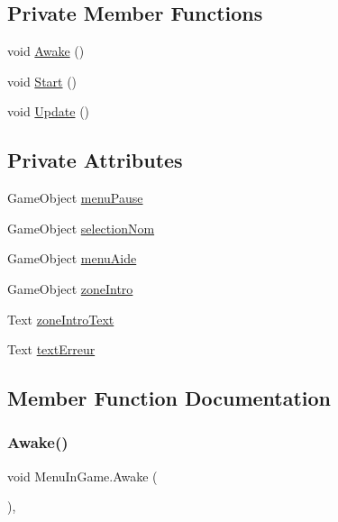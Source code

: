 \subsection*{Private Member Functions}
\begin{DoxyCompactItemize}
\item 
void \mbox{\hyperlink{class_menu_in_game_a999d7c65e06248c24bc4743b9f73a388}{Awake}} ()
\item 
void \mbox{\hyperlink{class_menu_in_game_a1dca3c194244a6dde3cbc99df42a819c}{Start}} ()
\item 
void \mbox{\hyperlink{class_menu_in_game_a47696469d25023de3d2e4d4098c4af12}{Update}} ()
\end{DoxyCompactItemize}
\subsection*{Private Attributes}
\begin{DoxyCompactItemize}
\item 
Game\+Object \mbox{\hyperlink{class_menu_in_game_ae4591a5743c35a0c966763b87511410a}{menu\+Pause}}
\item 
Game\+Object \mbox{\hyperlink{class_menu_in_game_a60c2fb12f01588304772cc84d1dc5969}{selection\+Nom}}
\item 
Game\+Object \mbox{\hyperlink{class_menu_in_game_a640204616a427a25eb14dd2a8ba91793}{menu\+Aide}}
\item 
Game\+Object \mbox{\hyperlink{class_menu_in_game_aa6b9002ac7378fbaf6da0c158bc97f26}{zone\+Intro}}
\item 
Text \mbox{\hyperlink{class_menu_in_game_add5f0054bf20eb4dccb2e3e1e6000d5b}{zone\+Intro\+Text}}
\item 
Text \mbox{\hyperlink{class_menu_in_game_a55b510bbfc983ae3d2c93c5ec7a1feca}{text\+Erreur}}
\end{DoxyCompactItemize}


\subsection{Member Function Documentation}
\mbox{\label{class_menu_in_game_a999d7c65e06248c24bc4743b9f73a388}} 
\subsubsection{\texorpdfstring{Awake()}{Awake()}}
{\footnotesize\ttfamily void Menu\+In\+Game.\+Awake (\begin{DoxyParamCaption}{ }\end{DoxyParamCaption})\hspace{0.3cm}{\ttfamily [inline]}, {\ttfamily [private]}}

